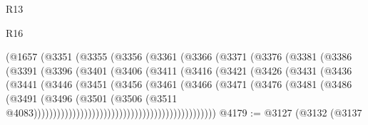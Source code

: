 \begin{lexlean}{R13}
\begin{lexlean}{R16}
\begin{coremodule}
{{{{{{{{{{{{{{{{{{{{{{{{{{{{{{{{{{{{{{{{{{{{{{{{{{{{{{{{{{{{{{{{{{{{{{{{{{{{{{{{{{{{{{{{{{{{{{{{{{{{{{{{{{{{{{{{{                            (@1657
                              (@3351
                                (@3355
                                  (@3356
                                    (@3361
                                      (@3366
                                        (@3371
                                          (@3376
                                            (@3381
                                              (@3386
                                                (@3391
                                                  (@3396
                                                    (@3401
                                                      (@3406
                                                        (@3411
                                                          (@3416
                                                            (@3421
                                                              (@3426
                                                                (@3431
                                                                  (@3436
                                                                    (@3441
                                                                      (@3446
                                                                        (@3451
                                                                          (@3456
                                                                            (@3461
                                                                              (@3466
                                                                                (@3471
                                                                                  (@3476
                                                                                    (@3481
                                                                                      (@3486
                                                                                        (@3491
                                                                                          (@3496
                                                                                            (@3501
                                                                                              (@3506
                                                                                                (@3511
                                                                                                  @4083)))))))))))))))))))))))))))))))))))))))))))))))
@4179 := @3127
    (@3132
      (@3137
}}}}}}}}}}}}}}}}}}}}}}}}}}}}}}}}}}}}}}}}}}}}}}}}}}}}}}}}}}}}}}}}}}}}}}}}}}}}}}}}}}}}}}}}}}}}}}}}}}}}}}}}}}}}}}}}}
\end{coremodule}
\end{lexlean}
\end{lexlean}
